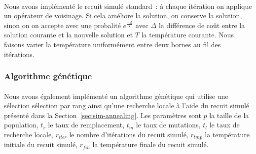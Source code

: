 \documentclass[12pt,letterpaper,twoside]{article}
\begin{document}
				\paragraph*{}
					Nous avons implémenté le recuit simulé standard~: à chaque itération on applique un opérateur de voisinage.
					Si cela améliore la solution, on conserve la solution, sinon on on accepte avec une probalité \(e^{\frac{-\Delta}{T}}\) avec \(\Delta\) la différence de coût
					entre la solution courante et la nouvelle solution et \(T\) la température courante.
					Nous faisons varier la température uniformément entre deux bornes au fil des itérations.

			\subsubsection{Algorithme génétique}
				\paragraph*{}
					Nous avons également implémenté un algorithme génétique qui utilise une sélection sélection par rang ainsi qu'une recherche locale
					à l'aide du recuit simulé présenté dans la Section~\ref{sec:sim-annealing}.
					Les paramètres sont \(p\) la taille de la population, \(t_r\) le taux de remplacement, \(t_m\) le taux de mutations,
					\(t_l\) le taux de recherche locale, \(r_{iter}\) le nombre d'itérations du recuit simulé, \(r_{tmp}\) la température initiale du recuit simulé,
					\(r_{fin}\) la température finale du recuit simulé.
\end{document}
